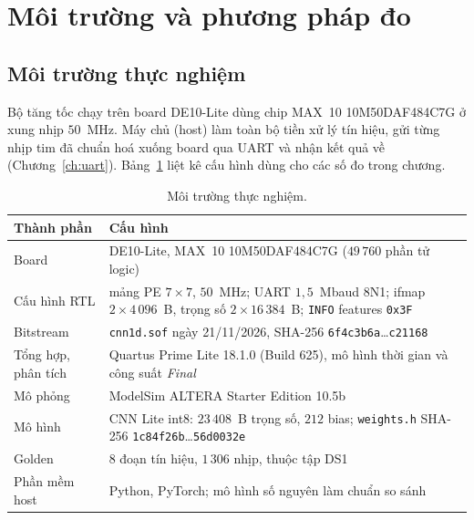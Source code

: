 \section{Môi trường và phương pháp đo}\label{sec:moitruong}
\subsection{Môi trường thực nghiệm}
Bộ tăng tốc chạy trên board DE10-Lite dùng chip MAX~10 10M50DAF484C7G ở xung nhịp $50$~MHz.
Máy chủ (host) làm toàn bộ tiền xử lý tín hiệu, gửi từng nhịp tim đã chuẩn hoá xuống board qua UART và nhận kết quả về (Chương~\ref{ch:uart}).
Bảng~\ref{tab:moitruong} liệt kê cấu hình dùng cho các số đo trong chương.

\begin{table}[htbp]\centering
\caption{Môi trường thực nghiệm.}\label{tab:moitruong}
\small\setlength{\tabcolsep}{4pt}
\begin{tabular}{@{}>{\raggedright\arraybackslash}p{3.6cm}>{\raggedright\arraybackslash}p{11cm}@{}}
\toprule
Thành phần & Cấu hình \\ \midrule
Board & DE10-Lite, MAX~10 10M50DAF484C7G ($49\,760$ phần tử logic) \\
Cấu hình RTL & mảng PE $7\times7$, $50$~MHz; UART $1{,}5$~Mbaud 8N1; ifmap $2\times4\,096$~B, trọng số $2\times16\,384$~B; \texttt{INFO} features \texttt{0x3F} \\
Bitstream & \texttt{cnn1d.sof} ngày 21/11/2026, SHA-256 \texttt{6f4c3b6a}\ldots\texttt{c21168} \\
Tổng hợp, phân tích & Quartus Prime Lite 18.1.0 (Build 625), mô hình thời gian và công suất \emph{Final} \\
Mô phỏng & ModelSim ALTERA Starter Edition 10.5b \\
Mô hình & CNN Lite int8: $23\,408$~B trọng số, $212$ bias; \texttt{weights.h} SHA-256 \texttt{1c84f26b}\ldots\texttt{56d0032e} \\
Golden & $8$ đoạn tín hiệu, $1\,306$ nhịp, thuộc tập DS1 \\
Phần mềm host & Python, PyTorch; mô hình số nguyên làm chuẩn so sánh \\ \bottomrule
\end{tabular}
\end{table}

